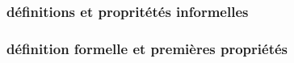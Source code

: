 \subsubsection{définitions et propritétés informelles}



\subsubsection{définition formelle et premières propriétés}

